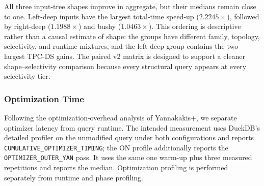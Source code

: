 All three input-tree shapes improve in aggregate, but their medians remain
close to one. Left-deep inputs have the largest total-time speed-up
($2.2245\times$), followed by right-deep ($1.1988\times$) and bushy
($1.0463\times$). This ordering is descriptive rather than a causal estimate of
shape: the groups have different family, topology, selectivity, and runtime
mixtures, and the left-deep group contains the two largest TPC-DS gains.
The paired v2 matrix is designed to support a cleaner shape--selectivity
comparison because every structural query appears at every selectivity tier.

\subsubsection{Optimization Time}
\label{sec:optimization-time}

Following the optimization-overhead analysis of Yannakakis+, we separate
optimizer latency from query runtime. The intended measurement uses DuckDB's
detailed profiler on the unmodified query under both configurations and reports
\texttt{CUMULATIVE\_OPTIMIZER\_TIMING}; the ON profile additionally reports the
\texttt{OPTIMIZER\_OUTER\_YAN} pass. It uses the same one warm-up plus three
measured repetitions and reports the median. Optimization profiling is
performed separately from runtime and phase profiling.

